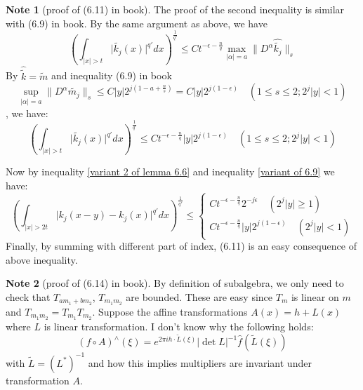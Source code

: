 \documentclass{report}
\theoremstyle{definition}
\newtheorem{note}{Note}
\theoremstyle{definition}
\theoremstyle{plain}
\numberwithin{theorem}{subsection}
\numberwithin{remark}{subsection}
\newcommand{\norm}[1]{\lVert#1\rVert}
\newcommand{\abs}[1]{\left\lvert#1\right\rvert}
\newcommand{\absl}[1]{\lvert#1\rvert}
\begin{document}
\begin{note}[proof of (6.11) in book]
    The proof of the second inequality is similar with (6.9) in book. By the same argument as
    above, we have
    \begin{equation*}
        (\int_{\abs{x}>t}\absl{\tilde{k_j}(x)}^{q'}dx)^\frac{1}{q'} \leq C t^{-\epsilon-\frac{n}{q}} \max_{\abs{\alpha}=a}{\norm{D^\alpha\hat{\tilde{k_j}}}_s}
    \end{equation*}
    By $\hat{\tilde{k}}=\tilde{m}$ and inequality (6.9) in book
    \begin{equation*}
        \sup_{\abs{\alpha}=a}\norm{D^{\alpha}\tilde{m_j}}_s\leq C \abs{y}2^{j(1-a+\frac{n}{s})}=C \abs{y}2^{j(1-\epsilon)}\quad (1\leq s\leq 2; 2^j\abs{y}<1)
    \end{equation*}
    , we have:
    \begin{equation}\label{variant of 6.9}
        (\int_{\abs{x}>t}\absl{\tilde{k_j}(x)}^{q'}dx)^\frac{1}{q'} \leq C t^{-\epsilon-\frac{n}{q}} \abs{y}2^{j(1-\epsilon)}\quad (1\leq s\leq 2; 2^j\abs{y}<1)
    \end{equation}

    Now by inequality \eqref{variant 2 of lemma 6.6} and inequality \eqref{variant of 6.9} we have:
    \[
        (\int_{\abs{x}>2t}\absl{k_j(x-y)-k_j(x)}^{q'}dx)^\frac{1}{q'}\leq\left\{
        \begin{aligned}
            Ct^{-\epsilon-\frac{n}{q}}2^{-j\epsilon}\quad (2^j\abs{y}\geq 1) \\
            C t^{-\epsilon-\frac{n}{q}} \abs{y}2^{j(1-\epsilon)}\quad (2^j\abs{y}<1)
        \end{aligned}
        \right.
    \]
    Finally, by summing with different part of index, (6.11) is an easy consequence of above inequality.
\end{note}
\begin{note}[proof of (6.14) in book]
    By definition of subalgebra, we only need to check that $T_{am_1+bm_2}$, $T_{m_1m_2}$ are bounded. These are easy since $T_m$ is linear on $m$ and $T_{m_1m_2}=T_{m_1}T_{m_2}$. Suppose the affine transformations $A(x)=h+L(x)$ where $L$ is linear transformation. {\color{blue} I don't know why the following holds:
            \begin{equation*}
                (f\circ A)^\wedge(\xi)=e^{2\pi i h\cdot\tilde{L}(\xi)}\abs{\det{L}}^{-1}\hat{f}(\tilde{L}(\xi))
            \end{equation*}
            with $\tilde{L}=(L^*)^{-1}$ and how this implies multipliers are invariant under transformation $A$}.
\end{note}
\end{document}
